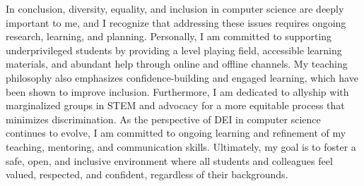 \documentclass[11pt,a4paper,sans]{moderncv}
\begin{document}
In conclusion, diversity, equality, and inclusion in computer science are deeply important to me, and I recognize that addressing these issues requires ongoing research, learning, and planning. 
Personally, I am committed to supporting underprivileged students by providing a level playing field, accessible learning materials, and abundant help through online and offline channels. 
My teaching philosophy also emphasizes confidence-building and engaged learning, which have been shown to improve inclusion. 
Furthermore, I am dedicated to allyship with marginalized groups in STEM and advocacy for a more equitable process that minimizes discrimination. 
As the perspective of DEI in computer science continues to evolve, I am committed to ongoing learning and refinement of my teaching, mentoring, and communication skills. 
Ultimately, my goal is to foster a safe, open, and inclusive environment where all students and colleagues feel valued, respected, and confident, regardless of their backgrounds.








\newpage
\printbibliography %
\end{document}
